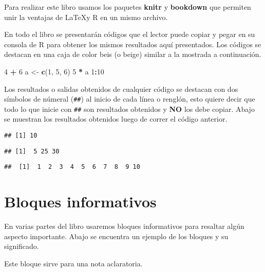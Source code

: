 \documentclass[10pt,]{krantz}
\makeatletter
\newenvironment{Shaded}{\begin{snugshade}}{\end{snugshade}}
\newcommand{\KeywordTok}[1]{\textcolor[rgb]{0.13,0.29,0.53}{\textbf{#1}}}
\newcommand{\DecValTok}[1]{\textcolor[rgb]{0.00,0.00,0.81}{#1}}
\newcommand{\StringTok}[1]{\textcolor[rgb]{0.31,0.60,0.02}{#1}}
\newcommand{\OperatorTok}[1]{\textcolor[rgb]{0.81,0.36,0.00}{\textbf{#1}}}
\newcommand{\NormalTok}[1]{#1}
\let\proglang=\textsf
\newenvironment{kframe}{%
\medskip{}
\setlength{\fboxsep}{.8em}
 \def\at@end@of@kframe{}%
 \ifinner\ifhmode%
  \def\at@end@of@kframe{\end{minipage}}%
  \begin{minipage}{\columnwidth}%
 \fi\fi%
 \def\FrameCommand##1{\hskip\@totalleftmargin \hskip-\fboxsep
 \colorbox{shadecolor}{##1}\hskip-\fboxsep
     \hskip-\linewidth \hskip-\@totalleftmargin \hskip\columnwidth}%
 \MakeFramed {\advance\hsize-\width
   \@totalleftmargin\z@ \linewidth\hsize
   \@setminipage}}%
 {\par\unskip\endMakeFramed%
 \at@end@of@kframe}
\renewenvironment{Shaded}{\begin{kframe}}{\end{kframe}}
\let\BeginKnitrBlock\begin \let\EndKnitrBlock\end
\makeatother
\begin{document}
Para realizar este libro usamos los paquetes \textbf{knitr}
\citep{xie2015} y \textbf{bookdown} \citep{R-bookdown}
que permiten unir la ventajas de \LaTeX y \proglang{R} en un mismo
archivo.

En todo el libro se presentarán códigos que el lector puede copiar y
pegar en su consola de \proglang{R} para obtener los mismos resultados
aquí presentados. Los códigos se destacan en una caja de color beis (o
beige) similar a la mostrada a continuación.

\begin{Shaded}
\begin{Highlighting}[]
\DecValTok{4} \OperatorTok{+}\StringTok{ }\DecValTok{6}
\NormalTok{a <-}\StringTok{ }\KeywordTok{c}\NormalTok{(}\DecValTok{1}\NormalTok{, }\DecValTok{5}\NormalTok{, }\DecValTok{6}\NormalTok{)}
\DecValTok{5} \OperatorTok{*}\StringTok{ }\NormalTok{a}
\DecValTok{1}\OperatorTok{:}\DecValTok{10}
\end{Highlighting}
\end{Shaded}

Los resultados o salidas obtenidos de cualquier código se destacan con
dos símbolos de númeral (\texttt{\#\#}) al inicio de cada línea o
renglón, esto quiere decir que todo lo que inicie con \texttt{\#\#} son
resultados obtenidos y \textbf{NO} los debe copiar. Abajo se muestran
los resultados obtenidos luego de correr el código anterior.

\begin{verbatim}
## [1] 10
\end{verbatim}

\begin{verbatim}
## [1]  5 25 30
\end{verbatim}

\begin{verbatim}
##  [1]  1  2  3  4  5  6  7  8  9 10
\end{verbatim}

\section*{Bloques informativos}\label{bloques-informativos}


En varias partes del libro usaremos bloques informativos para resaltar
algún aspecto importante. Abajo se encuentra un ejemplo de los bloques y
su significado.

\BeginKnitrBlock{rmdnote}
Este bloque sirve para una nota aclaratoria.
\EndKnitrBlock{rmdnote}
\end{document}
